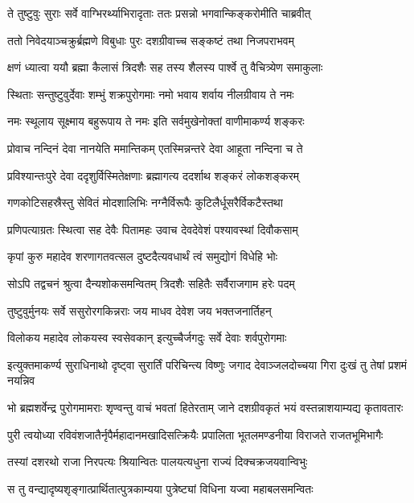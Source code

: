 \twolineshloka
{ते तुष्टुवुः सुराः सर्वे वाग्भिरर्थ्याभिरादृताः}
{ततः प्रसन्नो भगवान्किङ्करोमीति चाब्रवीत्}%

\twolineshloka
{ततो निवेदयाञ्चक्रुर्ब्रह्मणे विबुधाः पुरः}
{दशग्रीवाच्च सङ्कष्टं तथा निजपराभवम्}%

\twolineshloka
{क्षणं ध्यात्वा ययौ ब्रह्मा कैलासं त्रिदशैः सह}
{तस्य शैलस्य पार्श्वे तु वैचित्र्येण समाकुलाः}%

\twolineshloka
{स्थिताः सन्तुष्टुवुर्देवाः शम्भुं शक्रपुरोगमाः}
{नमो भवाय शर्वाय नीलग्रीवाय ते नमः}%

\twolineshloka
{नमः स्थूलाय सूक्ष्माय बहुरूपाय ते नमः}
{इति सर्वमुखेनोक्तां वाणीमाकर्ण्य शङ्करः}%

\twolineshloka
{प्रोवाच नन्दिनं देवा नानयेति ममान्तिकम्}
{एतस्मिन्नन्तरे देवा आहूता नन्दिना च ते}%

\twolineshloka
{प्रविश्यान्तःपुरे देवा ददृशुर्विस्मितेक्षणाः}
{ब्रह्मागत्य ददर्शाथ शङ्करं लोकशङ्करम्}%

\twolineshloka
{गणकोटिसहस्रैस्तु सेवितं मोदशालिभिः}
{नग्नैर्विरूपैः कुटिलैर्धूसरैर्विकटैस्तथा}%

\twolineshloka
{प्रणिपत्याग्रतः स्थित्वा सह देवैः पितामहः}
{उवाच देवदेवेशं पश्यावस्थां दिवौकसाम्}%

\twolineshloka
{कृपां कुरु महादेव शरणागतवत्सल}
{दुष्टदैत्यवधार्थं त्वं समुद्योगं विधेहि भोः}%

\twolineshloka
{सोऽपि तद्वचनं श्रुत्वा दैन्यशोकसमन्वितम्}
{त्रिदशैः सहितैः सर्वैराजगाम हरेः पदम्}%

\twolineshloka
{तुष्टुवुर्मुनयः सर्वे ससुरोरगकिन्नराः}
{जय माधव देवेश जय भक्तजनार्तिहन्}%

\twolineshloka
{विलोकय महादेव लोकयस्व स्वसेवकान्}
{इत्युच्चैर्जगदुः सर्वे देवाः शर्वपुरोगमाः}%

\twolineshloka
{इत्युक्तमाकर्ण्य सुराधिनाथो दृष्ट्वा सुरार्तिं परिचिन्त्य विष्णुः}
{जगाद देवाञ्जलदोच्चया गिरा दुःखं तु तेषां प्रशमं नयन्निव}%

\twolineshloka
{भो ब्रह्मशर्वेन्द्र पुरोगमामराः शृण्वन्तु वाचं भवतां हितेरताम्}
{जाने दशग्रीवकृतं भयं वस्तन्नाशयाम्यद्य कृतावतारः}%

\twolineshloka
{पुरी त्वयोध्या रविवंशजातैर्नृपैर्महादानमखादिसत्क्रियैः}
{प्रपालिता भूतलमण्डनीया विराजते राजतभूमिभागैः}%

\twolineshloka
{तस्यां दशरथो राजा निरपत्यः श्रियान्वितः}
{पालयत्यधुना राज्यं दिक्चक्रजयवान्विभुः}%

\twolineshloka
{स तु वन्द्यादृष्यशृङ्गात्प्रार्थितात्पुत्रकाम्यया}
{पुत्रेष्ट्यां विधिना यज्वा महाबलसमन्वितः}%

